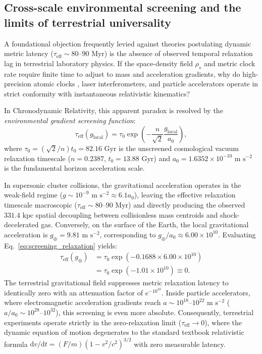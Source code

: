 \documentclass[aps,prd,reprint,superscriptaddress,nofootinbib,floatfix,amsmath,amssymb]{revtex4-2}
\begin{document}
\subsection{Cross-scale environmental screening and the limits of terrestrial universality}
\label{sec:screening_terrestrial}

A foundational objection frequently levied against theories postulating dynamic metric latency ($\tau_{\text{eff}} \sim 80\text{--}90\text{ Myr}$) is the absence of observed temporal relaxation lag in terrestrial laboratory physics. If the space-density field $\rho_s$ and metric clock rate require finite time to adjust to mass and acceleration gradients, why do high-precision atomic clocks \cite{Chou2010_OpticalClock}, laser interferometers, and particle accelerators operate in strict conformity with instantaneous relativistic kinematics?

In Chronodynamic Relativity, this apparent paradox is resolved by the \textit{environmental gradient screening function}:
\begin{equation}
\tau_{\text{eff}}(g_{\text{local}}) = \tau_0 \exp\left( -\frac{n}{\sqrt{2}} \frac{g_{\text{local}}}{a_0} \right),
\label{eq:screening_relaxation}
\end{equation}
where $\tau_0 = (\sqrt{2}/n) t_0 = 82.16\text{ Gyr}$ is the unscreened cosmological vacuum relaxation timescale ($n = 0.2387$, $t_0 = 13.88\text{ Gyr}$) and $a_0 = 1.6352 \times 10^{-10}\text{ m s}^{-2}$ is the fundamental horizon acceleration scale.

In supersonic cluster collisions, the gravitational acceleration operates in the weak-field regime ($g \sim 10^{-9}\text{ m s}^{-2} \approx 6.1 a_0$), leaving the effective relaxation timescale macroscopic ($\tau_{\text{eff}} \sim 80\text{--}90\text{ Myr}$) and directly producing the observed $331.4\text{ kpc}$ spatial decoupling between collisionless mass centroids and shock-decelerated gas. Conversely, on the surface of the Earth, the local gravitational acceleration is $g_\oplus = 9.81\text{ m s}^{-2}$, corresponding to $g_\oplus / a_0 \approx 6.00 \times 10^{10}$. Evaluating Eq.~\eqref{eq:screening_relaxation} yields:
\begin{align}
\tau_{\text{eff}}(g_\oplus) &= \tau_0 \exp\left( -0.1688 \times 6.00 \times 10^{10} \right) \nonumber \\
&= \tau_0 \exp\left( -1.01 \times 10^{10} \right) \equiv 0.
\end{align}
The terrestrial gravitational field suppresses metric relaxation latency to identically zero with an attenuation factor of $e^{-10^{10}}$. Inside particle accelerators, where electromagnetic acceleration gradients reach $a \sim 10^{18}\text{--}10^{22}\text{ m s}^{-2}$ ($a/a_0 \sim 10^{28}\text{--}10^{32}$), this screening is even more absolute. Consequently, terrestrial experiments operate strictly in the zero-relaxation limit ($\tau_{\text{eff}} \to 0$), where the dynamic equation of motion degenerates to the standard textbook relativistic formula $\mathrm{d}v/\mathrm{d}t = (F/m)(1 - v^2/c^2)^{3/2}$ with zero measurable latency.
\end{document}

